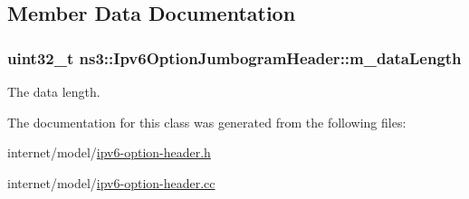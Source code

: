 \subsection{Member Data Documentation}
\subsubsection[{\texorpdfstring{m\+\_\+data\+Length}{m_dataLength}}]{\setlength{\rightskip}{0pt plus 5cm}uint32\+\_\+t ns3\+::\+Ipv6\+Option\+Jumbogram\+Header\+::m\+\_\+data\+Length\hspace{0.3cm}{\ttfamily [private]}}\hypertarget{classns3_1_1Ipv6OptionJumbogramHeader_ab9f077892b290a311493d02f8e14cf86}{}\label{classns3_1_1Ipv6OptionJumbogramHeader_ab9f077892b290a311493d02f8e14cf86}


The data length. 



The documentation for this class was generated from the following files\+:\begin{DoxyCompactItemize}
\item 
internet/model/\hyperlink{ipv6-option-header_8h}{ipv6-\/option-\/header.\+h}\item 
internet/model/\hyperlink{ipv6-option-header_8cc}{ipv6-\/option-\/header.\+cc}\end{DoxyCompactItemize}
